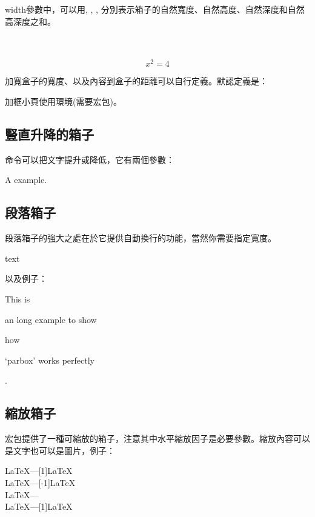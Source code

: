 width參數中，可以用, , , 分別表示箱子的自然寬度、自然高度、自然深度和自然高深度之和。

\begin{codeshow}
 \\
\\
\begin{equation}\boxed{x^2=4}
\end{equation}
\end{codeshow}

加寬盒子的寬度、以及內容到盒子的距離可以自行定義。默認定義是：
\begin{latex}
\setlength{\fboxrule}{0.4pt} \setlength{\fboxsep}{3pt}
\end{latex}

加框小頁使用環境(需要宏包)。

\subsection{豎直升降的箱子}
命令可以把文字提升或降低，它有兩個參數：

\begin{codeshow}
A\raisebox{-0.5ex}{n} example.
\end{codeshow}

\subsection{段落箱子}
段落箱子的強大之處在於它提供自動換行的功能，當然你需要指定寬度。
\begin{latex}
\parbox[pos]{width}{text}
\end{latex}

以及例子：

\begin{codeshow}
This is \parbox[t]{3.5em}{an long
example to show} how \parbox[b]
{4em}{`parbox' works perfectly}.
\end{codeshow}

\subsection{縮放箱子}
宏包提供了一種可縮放的箱子，注意其中水平縮放因子是必要參數。縮放內容可以是文字也可以是圖片，例子：
\begin{codeshow}
\LaTeX---\scalebox{-1}[1]{\LaTeX}\\
\LaTeX---\scalebox{1}[-1]{\LaTeX}\\
\LaTeX---\scalebox{-1}{\LaTeX}\\
\LaTeX---\scalebox{2}[1]{\LaTeX}
\end{codeshow}

